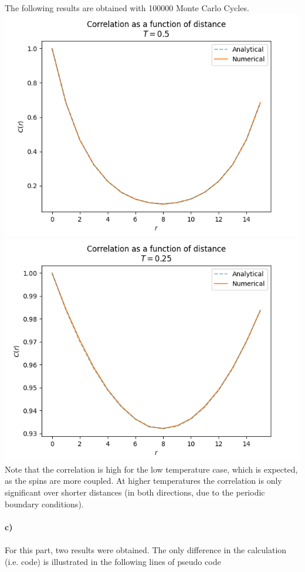 \documentclass[12pt]{article}
\begin{document}
The following results are obtained with 100000 Monte Carlo Cycles.\\
\includegraphics[width = \textwidth]{hTcorr.png} \\
\includegraphics[width = \textwidth]{lTcorr.png}
\\
Note that the correlation is high for the low temperature case, which is
expected, as the spins are more coupled. At higher temperatures the correlation
is only significant over shorter distances (in both directions, due to the
periodic boundary conditions).
\\ \\
\textbf{c)} \\
\\
\noindent For this part, two results were obtained. The only difference in the
calculation (i.e. code) is illustrated in the following lines of pseudo code
\end{document}
